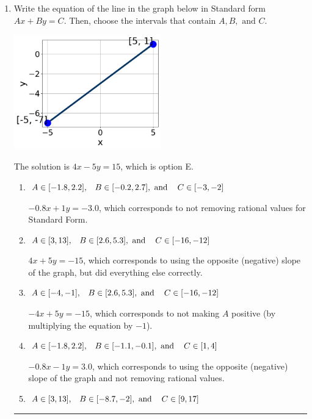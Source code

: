 \documentclass{extbook}[14pt]
\newcommand{\litem}[1]{\item #1

\rule{\textwidth}{0.4pt}}
\begin{document}
\begin{enumerate}\litem{
Write the equation of the line in the graph below in Standard form $Ax+By=C$. Then, choose the intervals that contain $A, B, \text{ and } C$.

\begin{center}
    \includegraphics[width=0.5\textwidth]{../Figures/linearGraphToStandardB.png}
\end{center}




The solution is \( 4x - 5y = 15 \), which is option E.\begin{enumerate}[label=\Alph*.]
\item \( A \in [-1.8, 2.2], \hspace{3mm} B \in [-0.2, 2.7], \text{ and } \hspace{3mm} C \in [-3, -2] \)

 $-0.8x + 1y = -3.0$, which corresponds to not removing rational values for Standard Form.
\item \( A \in [3, 13], \hspace{3mm} B \in [2.6, 5.3], \text{ and } \hspace{3mm} C \in [-16, -12] \)

 $4x + 5y = -15$, which corresponds to using the opposite (negative) slope of the graph, but did everything else correctly.
\item \( A \in [-4, -1], \hspace{3mm} B \in [2.6, 5.3], \text{ and } \hspace{3mm} C \in [-16, -12] \)

 $-4x + 5y = -15$, which corresponds to not making $A$ positive (by multiplying the equation by $-1$).
\item \( A \in [-1.8, 2.2], \hspace{3mm} B \in [-1.1, -0.1], \text{ and } \hspace{3mm} C \in [1, 4] \)

 $-0.8x - 1y = 3.0$, which corresponds to using the opposite (negative) slope of the graph and not removing rational values.
\item \( A \in [3, 13], \hspace{3mm} B \in [-8.7, -2], \text{ and } \hspace{3mm} C \in [9, 17] \)


\end{enumerate}}
\end{enumerate}
\end{document}
